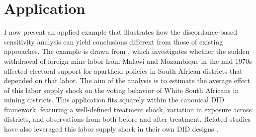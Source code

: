 \documentclass[twoside,11pt]{article}
\begin{document}



\section{Application} \label{sec: application}

I now present an applied example that illustrates how the discordance-based sensitivity analysis can yield conclusions different from those of existing approaches. The example is drawn from \citet{wilse-samson2013}, which investigates whether the sudden withdrawal of foreign mine labor from Malawi and Mozambique in the mid-1970s affected electoral support for apartheid policies in South African districts that depended on that labor. The aim of the analysis is to estimate the average effect of this labor supply shock on the voting behavior of White South Africans in mining districts. This application fits squarely within the canonical DID framework, featuring a well-defined treatment shock, variation in exposure across districts, and observations from both before and after treatment. Related studies have also leveraged this labor supply shock in their own DID designs \citep[e.g.,][]{dinkelmanmariotti2016,dinkelmanetal2024}.
\end{document}
